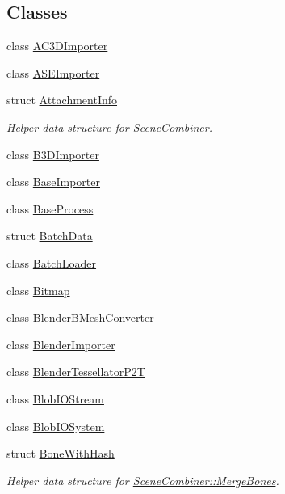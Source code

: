 \subsection*{Classes}
\begin{DoxyCompactItemize}
\item 
class \hyperlink{class_assimp_1_1_a_c3_d_importer}{A\+C3\+D\+Importer}
\item 
class \hyperlink{class_assimp_1_1_a_s_e_importer}{A\+S\+E\+Importer}
\item 
struct \hyperlink{struct_assimp_1_1_attachment_info}{Attachment\+Info}
\begin{DoxyCompactList}\small\item\em Helper data structure for \hyperlink{class_assimp_1_1_scene_combiner}{Scene\+Combiner}. \end{DoxyCompactList}\item 
class \hyperlink{class_assimp_1_1_b3_d_importer}{B3\+D\+Importer}
\item 
class \hyperlink{class_assimp_1_1_base_importer}{Base\+Importer}
\item 
class \hyperlink{class_assimp_1_1_base_process}{Base\+Process}
\item 
struct \hyperlink{struct_assimp_1_1_batch_data}{Batch\+Data}
\item 
class \hyperlink{class_assimp_1_1_batch_loader}{Batch\+Loader}
\item 
class \hyperlink{class_assimp_1_1_bitmap}{Bitmap}
\item 
class \hyperlink{class_assimp_1_1_blender_b_mesh_converter}{Blender\+B\+Mesh\+Converter}
\item 
class \hyperlink{class_assimp_1_1_blender_importer}{Blender\+Importer}
\item 
class \hyperlink{class_assimp_1_1_blender_tessellator_p2_t}{Blender\+Tessellator\+P2\+T}
\item 
class \hyperlink{class_assimp_1_1_blob_i_o_stream}{Blob\+I\+O\+Stream}
\item 
class \hyperlink{class_assimp_1_1_blob_i_o_system}{Blob\+I\+O\+System}
\item 
struct \hyperlink{struct_assimp_1_1_bone_with_hash}{Bone\+With\+Hash}
\begin{DoxyCompactList}\small\item\em Helper data structure for \hyperlink{class_assimp_1_1_scene_combiner_a4edb3acefc33160d667f47c045ef6ba8}{Scene\+Combiner\+::\+Merge\+Bones}. \end{DoxyCompactList}\item 

\end{DoxyCompactItemize}
